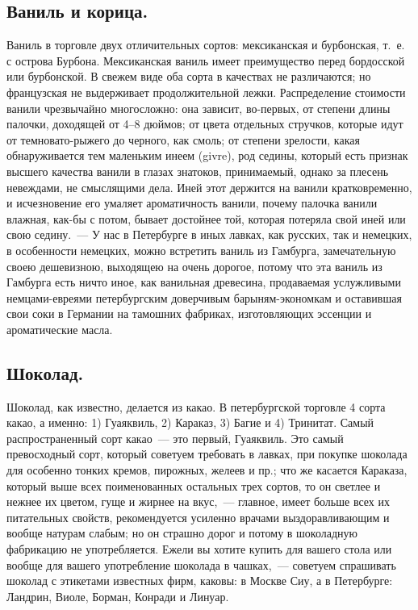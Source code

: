 \subsection{Ваниль и корица.}
Ваниль в торговле двух отличительных сортов: мексиканская и бурбонская, т.~е. с острова Бурбона. Мексиканская ваниль имеет преимущество перед бордосской или бурбонской. В свежем виде оба сорта в качествах не различаются; но французская не выдерживает продолжительной лежки. Распределение стоимости ванили чрезвычайно многосложно: она зависит, во-первых, от степени длины палочки, доходящей от 4–8 дюймов; от цвета отдельных стручков, которые идут от темновато-рыжего до черного, как смоль; от степени зрелости, какая обнаруживается тем маленьким инеем (givre), род седины, который есть признак высшего качества ванили в глазах знатоков, принимаемый, однако за плесень невеждами, не смыслящими дела. Иней этот держится на ванили кратковременно, и исчезновение его умаляет ароматичность ванили, почему палочка ванили влажная, как-бы с потом, бывает достойнее той, которая потеряла свой иней или свою седину.~--- У нас в Петербурге в иных лавках, как русских, так и немецких, в особенности немецких, можно встретить ваниль из Гамбурга, замечательную своею дешевизною, выходящею на очень дорогое, потому что эта ваниль из Гамбурга есть ничто иное, как ванильная древесина, продаваемая услужливыми немцами-евреями петербургским доверчивым барыням-экономкам и оставившая свои соки в Германии на тамошних фабриках, изготовляющих эссенции и ароматические масла.

\subsection{Шоколад.}
Шоколад, как известно, делается из какао. В петербургской торговле 4 сорта какао, а именно: 1) Гуаяквиль, 2) Караказ, 3) Багие и 4) Тринитат. Самый распространенный сорт какао~--- это первый, Гуаяквиль. Это самый превосходный сорт, который советуем требовать в лавках, при покупке шоколада для особенно тонких кремов, пирожных, желеев и пр.; что же касается Караказа, который выше всех поименованных остальных трех сортов, то он светлее и нежнее их цветом, гуще и жирнее на вкус,~--- главное, имеет больше всех их питательных свойств, рекомендуется усиленно врачами выздоравливающим и вообще натурам слабым; но он страшно дорог и потому в шоколадную фабрикацию не употребляется. Ежели вы хотите купить для вашего стола или вообще для вашего употребление шоколада в чашках,~--- советуем спрашивать шоколад с этикетами известных фирм, каковы: в Москве Сиу, а в Петербурге: Ландрин, Виоле, Борман, Конради и Линуар.


